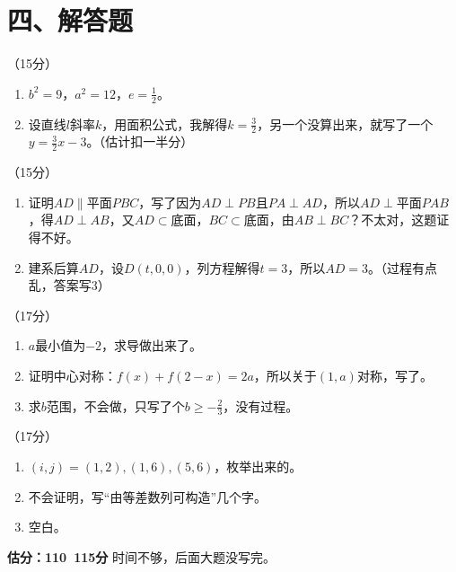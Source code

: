 \documentclass[12pt,a4paper]{article}
\begin{document}
\section*{四、解答题}

\item （15分）
\begin{enumerate}[label=(\arabic*)]
\item $b^2=9$，$a^2=12$，$e=\frac12$。
\item 设直线$l$斜率$k$，用面积公式，我解得$k=\frac32$，另一个没算出来，就写了一个$y=\frac32x-3$。（估计扣一半分）
\end{enumerate}

\item （15分）
\begin{enumerate}[label=(\arabic*)]
\item 证明$AD\parallel$平面$PBC$，写了因为$AD\perp PB$且$PA\perp AD$，所以$AD\perp$平面$PAB$，得$AD\perp AB$，又$AD\subset$底面，$BC\subset$底面，由$AB\perp BC$？不太对，这题证得不好。
\item 建系后算$AD$，设$D(t,0,0)$，列方程解得$t=3$，所以$AD=3$。（过程有点乱，答案写3）
\end{enumerate}

\item （17分）
\begin{enumerate}[label=(\arabic*)]
\item $a$最小值为$-2$，求导做出来了。
\item 证明中心对称：$f(x)+f(2-x)=2a$，所以关于$(1,a)$对称，写了。
\item 求$b$范围，不会做，只写了个$b\ge -\frac23$，没有过程。
\end{enumerate}

\item （17分）
\begin{enumerate}[label=(\arabic*)]
\item $(i,j)=(1,2),(1,6),(5,6)$，枚举出来的。
\item 不会证明，写“由等差数列可构造”几个字。
\item 空白。
\end{enumerate}

\vspace{1cm}
\begin{flushright}
\textbf{估分：110~115分} \quad 时间不够，后面大题没写完。
\end{flushright}
\end{document}
